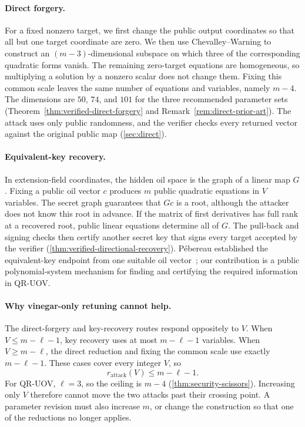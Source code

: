 \documentclass[11pt,a4paper]{article}
\theoremstyle{definition}
\theoremstyle{remark}
\newcommand{\QRUOV}{\textsf{QR-UOV}}
\begin{document}
\paragraph{Direct forgery.}
For a fixed nonzero target, we first change the public output coordinates so
that all but one target coordinate are zero.  We then use
Chevalley--Warning to construct an $(m-3)$-dimensional subspace on which three
of the corresponding quadratic forms vanish.  The remaining zero-target
equations are homogeneous, so multiplying a solution by a nonzero scalar does
not change them.  Fixing this common scale leaves the same number of equations
and variables, namely $m-4$.  The dimensions are $50$, $74$, and $101$ for
the three recommended parameter sets
(Theorem~\ref{thm:verified-direct-forgery} and
Remark~\ref{rem:direct-prior-art}).  The attack uses only public randomness,
and the verifier checks every returned vector against the original public map
(\cref{sec:direct}).

\paragraph{Equivalent-key recovery.}
In extension-field coordinates, the hidden oil space is the graph of a linear
map $G$.  Fixing a public oil vector $c$ produces $m$ public quadratic
equations in $V$ variables.  The secret graph guarantees that $Gc$ is a root,
although the attacker does not know this root in advance.  If the matrix of
first derivatives has full rank at a recovered root, public linear equations
determine all of $G$.  The pull-back and signing checks then certify another
secret key that signs every target accepted by the verifier
(\cref{thm:verified-directional-recovery}).  P\'ebereau established the
equivalent-key endpoint from one suitable oil vector~\cite{Pebereau}; our
contribution is a public polynomial-system mechanism for finding and certifying
the required information in \QRUOV{}.

\paragraph{Why vinegar-only retuning cannot help.}
The direct-forgery and key-recovery routes respond oppositely to $V$.  When
$V\leq m-\ell-1$, key recovery uses at most $m-\ell-1$ variables.
When $V\geq m-\ell$, the direct reduction and fixing the common scale use exactly
$m-\ell-1$.  These cases cover every integer $V$, so
\[
 r_{\mathrm{attack}}(V)\leq m-\ell-1.
\]
For \QRUOV{}, $\ell=3$, so the ceiling is $m-4$
(\cref{thm:security-scissors}).  Increasing only $V$ therefore cannot move the
two attacks past their crossing point.  A parameter revision must also
increase $m$, or change the construction so that one of the reductions no
longer applies.
\end{document}
